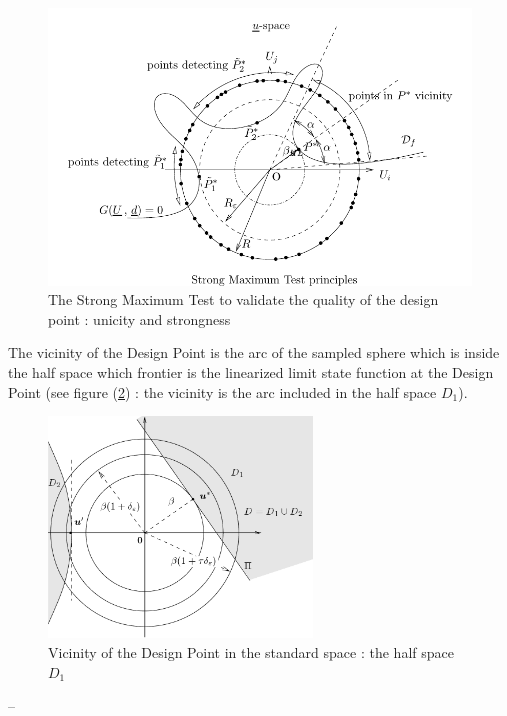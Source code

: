 {  \begin{figure}[H]
    \begin{center}
      \includegraphics[scale=0.85]{Figures/FigureStrongMaxTest.pdf}
      \caption{The Strong Maximum Test to validate the quality of the design point : unicity and strongness}
      \label{SMT}
    \end{center}
  \end{figure}

  The vicinity of the Design Point  is the arc of the sampled sphere which is inside the half space which frontier is the linearized limit state function at the Design Point (see figure (\ref{vicinity}) : the vicinity is the arc included in the half space $D_1$).

  \begin{figure}[H]
    \begin{center}
      \includegraphics[width=7cm]{Figures/StrongMaxTest_vicinity.png}
      \caption{Vicinity of the Design Point in the standard space : the half space $D_1$}
      \label{vicinity}
    \end{center}
  \end{figure}

}
{
  --}


